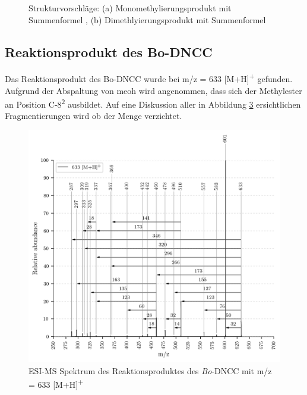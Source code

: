 \begin{figure}[!htbp]
\begin{subfigure}[b]{0.5\textwidth}
    \caption{}
    \label{fig:645MHStruktur}
  \end{subfigure}
  \caption[Strukturvorschläge für das Mono- und Dimethylierungsprodukt des \textit{Bo}-DYCC, Quelle: Autor]{Strukturvorschläge: (a) Monomethylierungsprodukt mit Summenformel , (b) Dimethlyierungsprodukt mit Summenformel }
\end{figure}

\subsection{Reaktionsprodukt des Bo-DNCC}

Das Reaktionsprodukt des Bo-DNCC wurde bei m/z = 633 [M+H]\textsuperscript{+} gefunden. Aufgrund der Abspaltung von \gls{meoh} wird angenommen, dass sich der Methylester an Position C-8\textsuperscript{2} ausbildet. Auf eine Diskussion aller in Abbildung \ref{fig:633MH} ersichtlichen Fragmentierungen wird ob der Menge verzichtet.

\begin{figure}[!htbp]
  \centering
  \includegraphics[width=\textwidth, height=0.7\textwidth]{figures/Kapitel7/Kataboliten/VWA_MS_633.png}
  \caption[ESI-MS Spektrum des Reaktionsproduktes von \textit{Bo}-DNCC, Quelle: Autor]{ESI-MS Spektrum des Reaktionsproduktes des \textit{Bo}-DNCC mit m/z = 633 [M+H]\textsuperscript{+}}
  \label{fig:633MH}
\end{figure}

